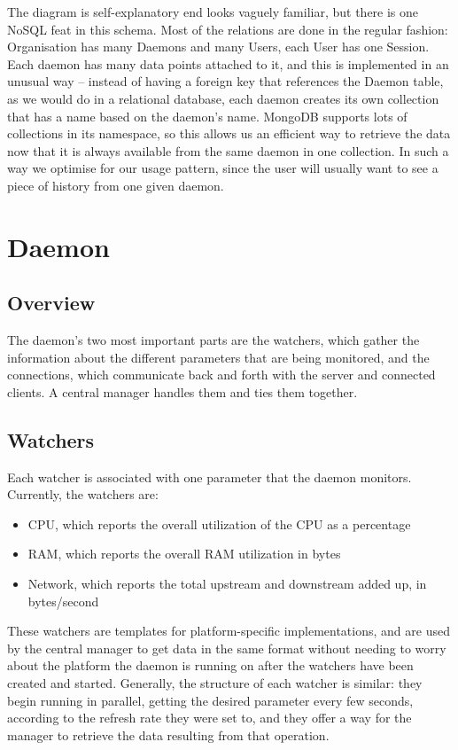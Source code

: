 \documentclass{l3proj}
\begin{document}
The diagram is self-explanatory end looks vaguely familiar, but there is one NoSQL feat in this schema. Most of the relations are done in the regular fashion: Organisation has many Daemons and many Users, each User has one Session. Each daemon has many data points attached to it, and this is implemented in an unusual way – instead of having a foreign key that references the Daemon table, as we would do in a relational database, each daemon creates its own collection that has a name based on the daemon's name. MongoDB supports lots of collections in its namespace, so this allows us an efficient way to retrieve the data now that it is always available from the same daemon in one collection. In such a way we optimise for our usage pattern, since the user will usually want to see a piece of history from one given daemon.


\section{Daemon}

\subsection{Overview}

The daemon's two most important parts are the watchers, which gather the information about the different parameters that are being monitored, and the connections, which communicate back and forth with the server and connected clients. A central manager handles them and ties them together.

\subsection{Watchers}

Each watcher is associated with one parameter that the daemon monitors. Currently, the watchers are:
\begin{itemize}
  \item CPU, which reports the overall utilization of the CPU as a percentage
  \item RAM, which reports the overall RAM utilization in bytes
  \item Network, which reports the total upstream and downstream added up, in bytes/second
\end{itemize}
These watchers are templates for platform-specific implementations, and are used by the central manager to get data in the same format without needing to worry about the platform the daemon is running on after the watchers have been created and started.
Generally, the structure of each watcher is similar: they begin running in parallel, getting the desired parameter every few seconds, according to the refresh rate they were set to, and they offer a way for the manager to retrieve the data resulting from that operation.
\end{document}
